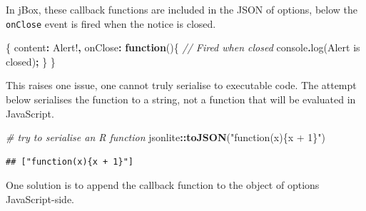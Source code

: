 \documentclass[
]{krantz}
\makeatletter
\newenvironment{Shaded}{\begin{snugshade}}{\end{snugshade}}
\newcommand{\BuiltInTok}[1]{#1}
\newcommand{\CommentTok}[1]{\textcolor[rgb]{0.37,0.37,0.37}{\textit{#1}}}
\newcommand{\DataTypeTok}[1]{\textcolor[rgb]{0.27,0.27,0.27}{#1}}
\newcommand{\FunctionTok}[1]{\textcolor[rgb]{0,0,0}{#1}}
\newcommand{\KeywordTok}[1]{\textcolor[rgb]{0.27,0.27,0.27}{\textbf{#1}}}
\newcommand{\NormalTok}[1]{#1}
\newcommand{\OperatorTok}[1]{\textcolor[rgb]{0.43,0.43,0.43}{\textbf{#1}}}
\newcommand{\StringTok}[1]{\textcolor[rgb]{0.5,0.5,0.5}{#1}}
\newenvironment{kframe}{%
\medskip{}
\setlength{\fboxsep}{.8em}
 \def\at@end@of@kframe{}%
 \ifinner\ifhmode%
  \def\at@end@of@kframe{\end{minipage}}%
  \begin{minipage}{\columnwidth}%
 \fi\fi%
 \def\FrameCommand##1{\hskip\@totalleftmargin \hskip-\fboxsep
 \colorbox{shadecolor}{##1}\hskip-\fboxsep
     \hskip-\linewidth \hskip-\@totalleftmargin \hskip\columnwidth}%
 \MakeFramed {\advance\hsize-\width
   \@totalleftmargin\z@ \linewidth\hsize
   \@setminipage}}%
 {\par\unskip\endMakeFramed%
 \at@end@of@kframe}
\renewenvironment{Shaded}{\begin{kframe}}{\end{kframe}}
\makeatother
\begin{document}
In jBox, these callback functions are included in the JSON of options, below the \texttt{onClose} event is fired when the notice is closed.

\begin{Shaded}
\begin{Highlighting}[]
\NormalTok{\{}
  \DataTypeTok{content}\OperatorTok{:} \StringTok{\textquotesingle{}Alert!\textquotesingle{}}\OperatorTok{,}
  \DataTypeTok{onClose}\OperatorTok{:} \KeywordTok{function}\NormalTok{()\{}
    \CommentTok{// Fired when closed }
    \BuiltInTok{console}\OperatorTok{.}\FunctionTok{log}\NormalTok{(}\StringTok{\textquotesingle{}Alert is closed\textquotesingle{}}\NormalTok{)}\OperatorTok{;}
\NormalTok{  \}}
\NormalTok{\}}
\end{Highlighting}
\end{Shaded}

This raises one issue, one cannot truly serialise to executable code. The attempt below serialises the function to a string, not a function that will be evaluated in JavaScript.

\begin{Shaded}
\begin{Highlighting}[]
\CommentTok{\# try to serialise an R function}
\NormalTok{jsonlite}\OperatorTok{::}\KeywordTok{toJSON}\NormalTok{(}\StringTok{"function(x)\{x + 1\}"}\NormalTok{)}
\end{Highlighting}
\end{Shaded}

\begin{verbatim}
## ["function(x){x + 1}"]
\end{verbatim}

One solution is to append the callback function to the object of options JavaScript-side.

\begin{Shaded}
\end{Shaded}
\end{document}
